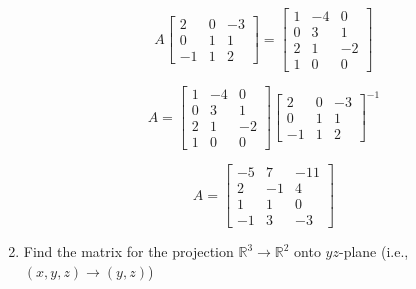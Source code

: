 \documentclass[a4paper,11pt]{article}
\begin{document}
\begin{preview}
\begin{enumerate}
			$$ A \begin{bmatrix}2&0&-3\\0&1&1\\-1&1&2\end{bmatrix} = \begin{bmatrix}1&-4&0\\0&3&1\\2&1&-2\\1&0&0\end{bmatrix}$$

			$$ A = \begin{bmatrix}1&-4&0\\0&3&1\\2&1&-2\\1&0&0\end{bmatrix} \begin{bmatrix}2&0&-3\\0&1&1\\-1&1&2\end{bmatrix}^{-1} $$

			$$ A = \begin{bmatrix}-5&7&-11\\ 2&-1&4\\ 1&1&0\\ -1&3&-3\end{bmatrix}$$

        \item Find the matrix for the projection $\mathbb{R}^3 \rightarrow \mathbb{R}^2$ onto $yz$-plane (i.e., $(x,y,z) \rightarrow (y,z)$)
        

\end{enumerate}
\end{preview}
\end{document}
